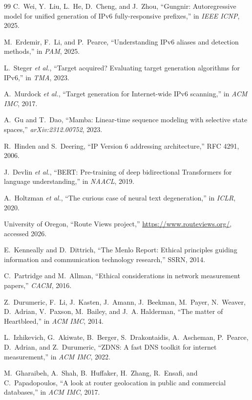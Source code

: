 \documentclass[conference]{IEEEtran}
\begin{document}
\begin{thebibliography}{99}
C.~Wei, Y.~Liu, L.~He, D.~Cheng, and J.~Zhou,
``Gungnir: Autoregressive model for unified generation of IPv6
fully-responsive prefixes,''
in \emph{IEEE ICNP}, 2025.

M.~Erdemir, F.~Li, and P.~Pearce,
``Understanding IPv6 aliases and detection methods,''
in \emph{PAM}, 2025.

L.~Steger \emph{et al.},
``Target acquired? Evaluating target generation algorithms for IPv6,''
in \emph{TMA}, 2023.

A.~Murdock \emph{et al.},
``Target generation for Internet-wide IPv6 scanning,''
in \emph{ACM IMC}, 2017.

A.~Gu and T.~Dao,
``Mamba: Linear-time sequence modeling with selective state spaces,''
\emph{arXiv:2312.00752}, 2023.

R.~Hinden and S.~Deering,
``IP Version 6 addressing architecture,''
RFC 4291, 2006.

J.~Devlin \emph{et al.},
``BERT: Pre-training of deep bidirectional Transformers for
language understanding,''
in \emph{NAACL}, 2019.

A.~Holtzman \emph{et al.},
``The curious case of neural text degeneration,''
in \emph{ICLR}, 2020.

University of Oregon,
``Route Views project,''
\url{https://www.routeviews.org/}, accessed 2026.

E.~Kenneally and D.~Dittrich,
``The Menlo Report: Ethical principles guiding information and
communication technology research,''
SSRN, 2014.

C.~Partridge and M.~Allman,
``Ethical considerations in network measurement papers,''
\emph{CACM}, 2016.

Z.~Durumeric, F.~Li, J.~Kasten, J.~Amann, J.~Beekman, M.~Payer,
N.~Weaver, D.~Adrian, V.~Paxson, M.~Bailey, and J.~A. Halderman,
``The matter of Heartbleed,''
in \emph{ACM IMC}, 2014.

L.~Izhikevich, G.~Akiwate, B.~Berger, S.~Drakontaidis, A.~Ascheman,
P.~Pearce, D.~Adrian, and Z.~Durumeric,
``ZDNS: A fast DNS toolkit for internet measurement,''
in \emph{ACM IMC}, 2022.

M.~Gharaibeh, A.~Shah, B.~Huffaker, H.~Zhang, R.~Ensafi, and
C.~Papadopoulos,
``A look at router geolocation in public and commercial databases,''
in \emph{ACM IMC}, 2017.


\end{thebibliography}
\end{document}
